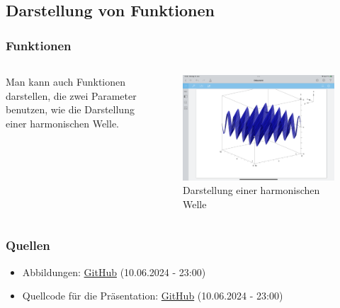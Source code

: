 \documentclass[10pt,ngerman]{beamer}
\begin{document}
\subsection{Darstellung von Funktionen}

\begin{frame}
	\frametitle{Funktionen}

	\begin{columns}
		\begin{column}{0.5\textwidth}
			Man kann auch Funktionen darstellen, die zwei Parameter benutzen, wie die Darstellung einer harmonischen Welle.
		\end{column}

		\begin{column}{0.5\textwidth}
			\begin{figure}
				\centering
				\includegraphics[width=\textwidth]{IMG_1448.png}
				\caption{Darstellung einer harmonischen Welle}
				\label{fig:Darstellung-Welle}
			\end{figure}
		\end{column}
	\end{columns}
\end{frame}

\begin{frame}
	\frametitle{Quellen}

	\begin{itemize}
		\item Abbildungen: \href{https://github.com/baumbus/ti}{GitHub} (10.06.2024 - 23:00)
		\item Quellcode für die Präsentation: \href{https://github.com/baumbus/ti}{GitHub} (10.06.2024 - 23:00)
	\end{itemize}
\end{frame}
\end{document}
